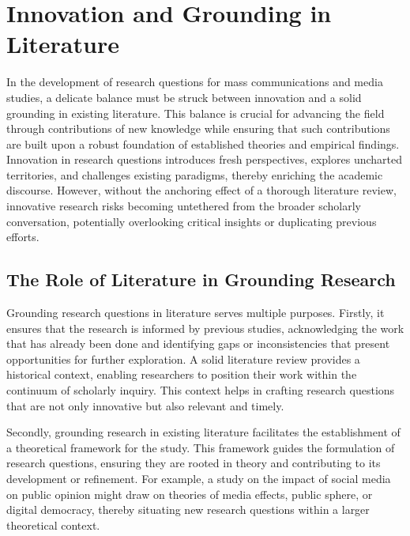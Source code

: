 \documentclass[
]{book}
\begin{document}
\hypertarget{innovation-and-grounding-in-literature}{%
\section*{Innovation and Grounding in Literature}\label{innovation-and-grounding-in-literature}}

In the development of research questions for mass communications and media studies, a delicate balance must be struck between innovation and a solid grounding in existing literature. This balance is crucial for advancing the field through contributions of new knowledge while ensuring that such contributions are built upon a robust foundation of established theories and empirical findings. Innovation in research questions introduces fresh perspectives, explores uncharted territories, and challenges existing paradigms, thereby enriching the academic discourse. However, without the anchoring effect of a thorough literature review, innovative research risks becoming untethered from the broader scholarly conversation, potentially overlooking critical insights or duplicating previous efforts.

\hypertarget{the-role-of-literature-in-grounding-research}{%
\subsection*{The Role of Literature in Grounding Research}\label{the-role-of-literature-in-grounding-research}}

Grounding research questions in literature serves multiple purposes. Firstly, it ensures that the research is informed by previous studies, acknowledging the work that has already been done and identifying gaps or inconsistencies that present opportunities for further exploration. A solid literature review provides a historical context, enabling researchers to position their work within the continuum of scholarly inquiry. This context helps in crafting research questions that are not only innovative but also relevant and timely.

Secondly, grounding research in existing literature facilitates the establishment of a theoretical framework for the study. This framework guides the formulation of research questions, ensuring they are rooted in theory and contributing to its development or refinement. For example, a study on the impact of social media on public opinion might draw on theories of media effects, public sphere, or digital democracy, thereby situating new research questions within a larger theoretical context.
\end{document}
